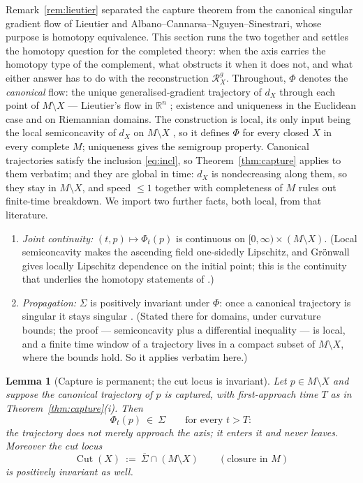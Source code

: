 \documentclass[11pt]{article}
\newtheorem{lemma}[theorem]{Lemma}
\theoremstyle{remark}
\newcommand{\R}{\mathbb{R}}
\newcommand{\X}{X}
\newcommand{\Rg}{\mathcal{R}^{g}_{\X}}
\newcommand{\dX}{d_{\X}}
\newcommand{\Cut}{\operatorname{Cut}}
\begin{document}
Remark~\ref{rem:lieutier} separated the capture theorem from the
canonical singular gradient flow of Lieutier and
Albano--Cannarsa--Nguyen--Sinestrari, whose purpose is homotopy
equivalence. This section runs the two together and settles the
homotopy question for the completed theory: when the axis carries
the homotopy type of the complement, what obstructs it when it does
not, and what either answer has to do with the reconstruction
$\Rg$. Throughout, $\Phi$ denotes the \emph{canonical} flow: the
unique generalised-gradient trajectory of $\dX$ through each point
of $M\setminus\X$ --- Lieutier's flow in $\R^{n}$ \cite{Lie};
existence and uniqueness \cite[Thm.~3.4, Cor.~3.6]{ACNS} in the
Euclidean case and \cite[\S4]{ACNS} on Riemannian domains. The
construction is local, its only input being the local semiconcavity
of $\dX$ on $M\setminus\X$ \cite{ACa,MM}, so it defines $\Phi$ for
every closed $\X$ in every complete $M$; uniqueness gives the
semigroup property. Canonical trajectories satisfy the inclusion
\eqref{eq:incl}, so Theorem~\ref{thm:capture} applies to them
verbatim; and they are global in time: $\dX$ is nondecreasing along
them, so they stay in $M\setminus\X$, and speed $\le1$ together with
completeness of $M$ rules out finite-time breakdown. We import two
further facts, both local, from that literature.
\begin{enumerate}[label=\textup{(F\arabic*)}]
\item\label{F1} \emph{Joint continuity:}
$(t,p)\mapsto\Phi_{t}(p)$ is continuous on
$[0,\infty)\times(M\setminus\X)$. (Local semiconcavity makes the
ascending field one-sidedly Lipschitz, and Gr\"onwall gives locally
Lipschitz dependence on the initial point; this is the continuity
that underlies the homotopy statements of \cite{Lie,ACNS}.)
\item\label{F2} \emph{Propagation:} $\Sigma$ is positively invariant
under $\Phi$: once a canonical trajectory is singular it stays
singular \cite[Thms.~3.7 and~4.5]{ACNS}. (Stated there for domains,
under curvature bounds; the proof --- semiconcavity plus a
differential inequality --- is local, and a finite time window of a
trajectory lives in a compact subset of $M\setminus\X$, where the
bounds hold. So it applies verbatim here.)
\end{enumerate}

\begin{lemma}[Capture is permanent; the cut locus is invariant]
\label{lem:perm}
Let $p\in M\setminus\X$ and suppose the canonical trajectory of $p$
is captured, with first-approach time $T$ as in
Theorem~\ref{thm:capture}\textup{(i)}. Then
\[
  \Phi_{t}(p)\ \in\ \Sigma\qquad\text{for every }t>T :
\]
the trajectory does not merely approach the axis; it enters it and
never leaves. Moreover the cut locus
\[
  \Cut(\X)\ :=\ \overline{\Sigma}\cap(M\setminus\X)
  \qquad(\text{closure in }M)
\]
is positively invariant as well.
\end{lemma}
\end{document}
